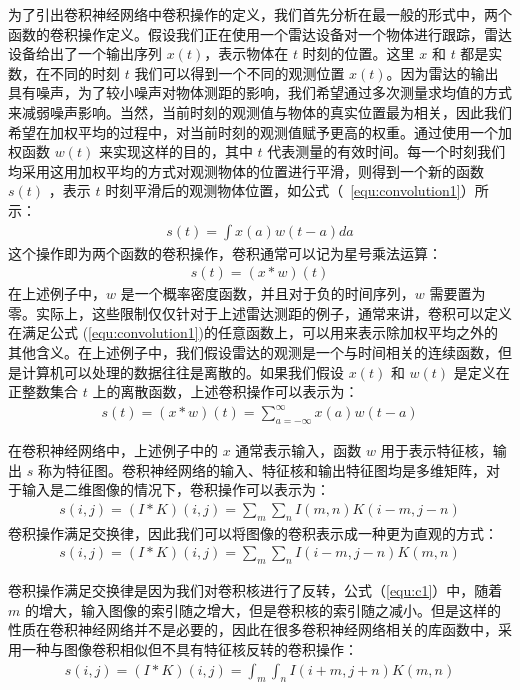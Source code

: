 为了引出卷积神经网络中卷积操作的定义，我们首先分析在最一般的形式中，两个函数的卷积操作定义。假设我们正在使用一个雷达设备对一个物体进行跟踪，雷达设备给出了一个输出序列 $x(t)$，表示物体在 $t$ 时刻的位置。这里 $x$ 和 $t$ 都是实数，在不同的时刻 $t$ 我们可以得到一个不同的观测位置 $x(t)$。因为雷达的输出具有噪声，为了较小噪声对物体测距的影响，我们希望通过多次测量求均值的方式来减弱噪声影响。当然，当前时刻的观测值与物体的真实位置最为相关，因此我们希望在加权平均的过程中，对当前时刻的观测值赋予更高的权重。通过使用一个加权函数 $w(t)$ 来实现这样的目的，其中 $t$ 代表测量的有效时间。每一个时刻我们均采用这用加权平均的方式对观测物体的位置进行平滑，则得到一个新的函数 $s(t)$ ，表示 $t$ 时刻平滑后的观测物体位置，如公式（~\ref{equ:convolution1}）所示：
\begin{eqnarray} \label{equ:convolution1}
s(t)=\int{x(a)w(t-a)da}
\end{eqnarray}
这个操作即为两个函数的卷积操作，卷积通常可以记为星号乘法运算：
\begin{eqnarray} \label{equ:convolution2}
s(t)=(x*w)(t)
\end{eqnarray}
在上述例子中，$w$ 是一个概率密度函数，并且对于负的时间序列，$w$ 需要置为零。实际上，这些限制仅仅针对于上述雷达测距的例子，通常来讲，卷积可以定义在满足公式 (\ref{equ:convolution1})的任意函数上，可以用来表示除加权平均之外的其他含义。在上述例子中，我们假设雷达的观测是一个与时间相关的连续函数，但是计算机可以处理的数据往往是离散的。如果我们假设 $x(t)$ 和 $w(t)$ 是定义在正整数集合 $t$ 上的离散函数，上述卷积操作可以表示为：
\begin{eqnarray} \label{equ:convolution3}
s(t)=(x*w)(t)=\sum_{a=-\infty}^{\infty}x(a)w(t-a)
\end{eqnarray}

在卷积神经网络中，上述例子中的 $x$ 通常表示输入，函数 $w$ 用于表示特征核，输出 $s$ 称为特征图。卷积神经网络的输入、特征核和输出特征图均是多维矩阵，对于输入是二维图像的情况下，卷积操作可以表示为：
\begin{eqnarray} \label{equ:c1}
s(i,j)=(I*K)(i,j)=\sum_{m}\sum_{n}I(m,n)K(i-m,j-n)
\end{eqnarray}
卷积操作满足交换律，因此我们可以将图像的卷积表示成一种更为直观的方式：
\begin{eqnarray} \label{equ:c2}
s(i,j)=(I*K)(i,j)=\sum_{m}\sum_{n}I(i-m,j-n)K(m,n)
\end{eqnarray}

卷积操作满足交换律是因为我们对卷积核进行了反转，公式（\ref{equ:c1}）中，随着 $m$ 的增大，输入图像的索引随之增大，但是卷积核的索引随之减小。但是这样的性质在卷积神经网络并不是必要的，因此在很多卷积神经网络相关的库函数中，采用一种与图像卷积相似但不具有特征核反转的卷积操作：
\begin{eqnarray} \label{equ:c3}
s(i,j)=(I*K)(i,j)=\int_{m}\int_{n}I(i+m,j+n)K(m,n)
\end{eqnarray}


